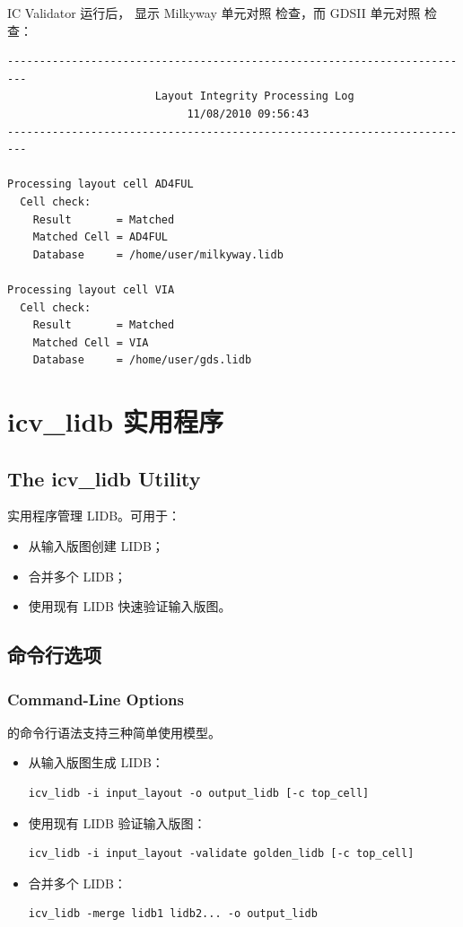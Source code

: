 IC Validator 运行后， 显示 Milkyway 单元对照  检查，而 GDSII 单元对照  检查：

\begin{lstlisting}
-------------------------------------------------------------------------
                       Layout Integrity Processing Log
                            11/08/2010 09:56:43
-------------------------------------------------------------------------

Processing layout cell AD4FUL
  Cell check:
    Result       = Matched
    Matched Cell = AD4FUL
    Database     = /home/user/milkyway.lidb

Processing layout cell VIA
  Cell check:
    Result       = Matched
    Matched Cell = VIA
    Database     = /home/user/gds.lidb
\end{lstlisting}

\section{icv\_lidb 实用程序}
\subsection*{The icv\_lidb Utility}

 实用程序管理 LIDB。可用于：
\begin{itemize}
  \item 从输入版图创建 LIDB；
  \item 合并多个 LIDB；
  \item 使用现有 LIDB 快速验证输入版图。
\end{itemize}

\subsection{命令行选项}
\subsubsection*{Command-Line Options}

 的命令行语法支持三种简单使用模型。
\begin{itemize}
  \item 从输入版图生成 LIDB：
\begin{lstlisting}
icv_lidb -i input_layout -o output_lidb [-c top_cell]
\end{lstlisting}
  \item 使用现有 LIDB 验证输入版图：
\begin{lstlisting}
icv_lidb -i input_layout -validate golden_lidb [-c top_cell]
\end{lstlisting}
  \item 合并多个 LIDB：
\begin{lstlisting}
icv_lidb -merge lidb1 lidb2... -o output_lidb
\end{lstlisting}
\end{itemize}

